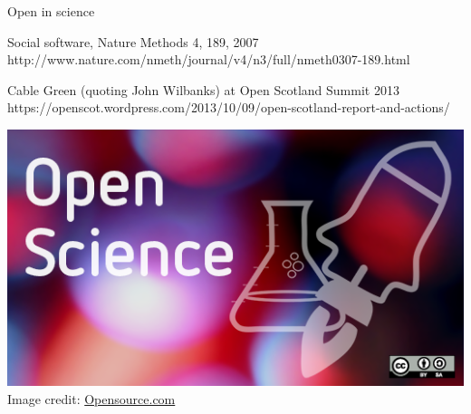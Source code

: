 \documentclass[xcolor={dvipsnames,usenames},beamer,aspectratio=169]{beamer}
\begin{document}
\begin{frame}{Open in science}

  {Social software, Nature Methods 4, 189, 2007}%
  {http://www.nature.com/nmeth/journal/v4/n3/full/nmeth0307-189.html}



%
  {Cable Green (quoting John Wilbanks) at Open Scotland Summit 2013}
  {https://openscot.wordpress.com/2013/10/09/open-scotland-report-and-actions/}

\bigskip
\bigskip

\centering
\includegraphics[height=0.4\textheight]{./images/general/open_science}%
\\
\tiny
Image credit: \href{https://opensource.com/}{Opensource.com}


\end{frame}
\end{document}
